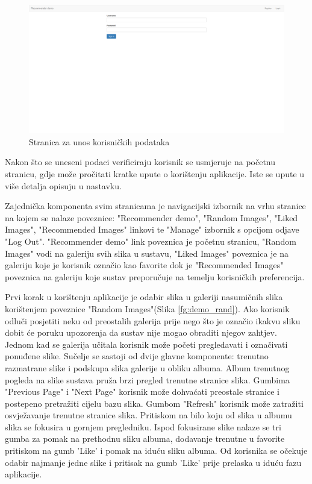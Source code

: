 \documentclass[times, utf8, proizvoljni, numeric]{fer}
\begin{document}
\begin{figure}[!ht]
	\begin{center}
		\captionsetup{justification=centering}
		\includegraphics[width=1.0\textwidth]{./imgs/demo-preporucitelja-po-sadrzaju/tijek-rada/demo-login.png}
		\caption{Stranica za unos korisničkih podataka}
		\label{fg:demo_login}
	\end{center}
\end{figure}

Nakon što se uneseni podaci verificiraju korisnik se usmjeruje na početnu stranicu, gdje može pročitati kratke upute o korištenju aplikacije. Iste se upute u više detalja opisuju u nastavku.

Zajednička komponenta svim stranicama je navigacijski izbornik na vrhu stranice na kojem se nalaze poveznice: "Recommender demo", "Random Images", "Liked Images", "Recommended Images" linkovi te "Manage" izbornik s opcijom odjave "Log Out". "Recommender demo" link poveznica je početnu stranicu, "Random Images" vodi na galeriju svih slika u sustavu, "Liked Images" poveznica je na galeriju koje je korisnik označio kao favorite dok je "Recommended Images" poveznica na galeriju koje sustav preporučuje na temelju korisničkih preferencija.

Prvi korak u korištenju aplikacije je odabir slika u galeriji nasumičnih slika korištenjem poveznice "Random Images"(Slika \ref{fg:demo_rand}). Ako korisnik odluči posjetiti neku od preostalih galerija prije nego što je označio ikakvu sliku dobit će poruku upozorenja da sustav nije mogao obraditi njegov zahtjev. Jednom kad se galerija učitala korisnik može početi pregledavati i označivati ponuđene slike. Sučelje se sastoji od dvije glavne komponente: trenutno razmatrane slike i podskupa slika galerije u obliku albuma. Album trenutnog pogleda na slike sustava pruža brzi pregled trenutne stranice slika. Gumbima "Previous Page" i "Next Page" korisnik može dohvaćati preostale stranice i postepeno pretražiti cijelu bazu slika. Gumbom "Refresh" korisnik može zatražiti osvježavanje trenutne stranice slika. Pritiskom na bilo koju od slika u albumu slika se fokusira u gornjem pregledniku. Ispod fokusirane slike nalaze se tri gumba za pomak na prethodnu sliku albuma, dodavanje trenutne u favorite pritiskom na gumb 'Like' i pomak na iduću sliku albuma. Od korisnika se očekuje odabir najmanje jedne slike i pritisak na gumb 'Like' prije prelaska u iduću fazu aplikacije.
\end{document}
